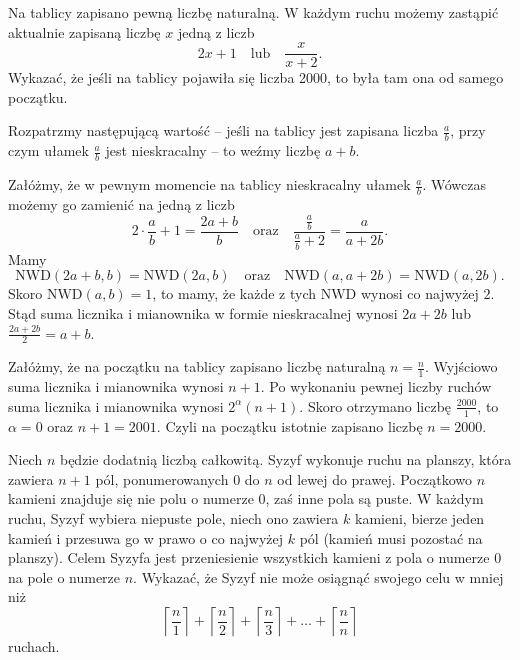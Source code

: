 \begin{problem}{5}
Na tablicy zapisano pewną liczbę naturalną. W każdym ruchu możemy zastąpić aktualnie zapisaną liczbę $x$ jedną z liczb 
\[
    2x + 1 \quad  \text{lub} \quad \dfrac{x}{x + 2}.
\]
Wykazać, że jeśli na tablicy pojawiła się liczba 2000, to była tam ona od samego początku.
\end{problem}

\noindent
Rozpatrzmy następującą wartość -- jeśli na tablicy jest zapisana liczba $\frac{a}{b}$, przy czym ułamek $\frac{a}{b}$ jest nieskracalny -- to weźmy liczbę $a + b$.

\vspace{10px}
\noindent
Załóżmy, że w pewnym momencie na tablicy nieskracalny ułamek $\frac{a}{b}$. Wówczas możemy go zamienić na jedną z liczb 
\[
	2\cdot \frac{a}{b} + 1 = \frac{2a + b}{b} \quad \text{oraz} \quad \frac{\frac{a}{b}}{\frac{a}{b} + 2} = \frac{a}{a + 2b}.
\]
Mamy
\[
	\mathrm{NWD}(2a + b, b) = \mathrm{NWD}(2a, b) \quad \text{oraz} \quad \mathrm{NWD}(a, a + 2b) = \mathrm{NWD}(a, 2b). 
\]
Skoro $\mathrm{NWD}(a, b) = 1$, to mamy, że każde z tych $\mathrm{NWD}$ wynosi co najwyżej $2$. Stąd suma licznika i mianownika w formie nieskracalnej wynosi $2a + 2b$ lub $\frac{2a + 2b}{2} = a + b$. 

\vspace{10px}
\noindent
Załóżmy, że na początku na tablicy zapisano liczbę naturalną $n = \frac{n}{1}$. Wyjściowo suma licznika i mianownika wynosi $n + 1$. Po wykonaniu pewnej liczby ruchów suma licznika i mianownika wynosi $2^{\alpha}(n + 1)$. Skoro otrzymano liczbę $\frac{2000}{1}$, to $\alpha = 0$ oraz $n + 1 = 2001$. Czyli na początku istotnie zapisano liczbę $n = 2000$.

\vspace{5px}

\begin{problem}{6}
Niech $n$ będzie dodatnią liczbą całkowitą. Syzyf wykonuje ruchu na planszy, która zawiera $n + 1$ pól, ponumerowanych $0$ do $n$ od lewej do prawej. Początkowo $n$ kamieni znajduje się nie polu o numerze $0$, zaś inne pola są puste. W każdym ruchu, Syzyf wybiera niepuste pole, niech ono zawiera $k$ kamieni, bierze jeden kamień i przesuwa go w prawo o co najwyżej $k$ pól (kamień musi pozostać na planszy). Celem Syzyfa jest przeniesienie wszystkich kamieni z pola o numerze $0$ na pole o numerze $n$.
Wykazać, że Syzyf nie może osiągnąć swojego celu w mniej niż
\[ 
	\left \lceil \frac{n}{1} \right \rceil + \left \lceil \frac{n}{2} \right \rceil + \left \lceil \frac{n}{3} \right \rceil + \dots + \left \lceil \frac{n}{n} \right \rceil 
\]
ruchach.
\end{problem}

